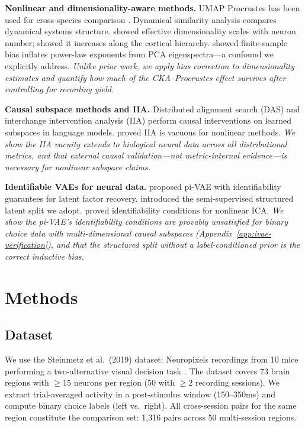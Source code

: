 \documentclass{article}
\begin{document}
\textbf{Nonlinear and dimensionality-aware methods.}
UMAP Procrustes has been used for cross-species comparison \citep{deitch2021representational}. Dynamical similarity analysis \citep{ostrow2023beyond} compares dynamical systems structure.
\citet{stringer2024unbounded} showed effective dimensionality scales with neuron number; \citet{huntenburg2024categorical} showed it increases along the cortical hierarchy.
\citet{chun2025dimensionality} showed finite-sample bias inflates power-law exponents from PCA eigenspectra---a confound we explicitly address.
\emph{Unlike prior work, we apply bias correction to dimensionality estimates and quantify how much of the CKA--Procrustes effect survives after controlling for recording yield.}

\textbf{Causal subspace methods and IIA.}
Distributed alignment search (DAS) and interchange intervention analysis (IIA) \citep{geiger2024causal, geiger2024finding} perform causal interventions on learned subspaces in language models.
\citet{sutter2025iia} proved IIA is vacuous for nonlinear methods.
\emph{We show the IIA vacuity extends to biological neural data across all distributional metrics, and that external causal validation---not metric-internal evidence---is necessary for nonlinear subspace claims.}

\textbf{Identifiable VAEs for neural data.}
\citet{zhou2020pivae} proposed pi-VAE with identifiability guarantees for latent factor recovery.
\citet{narayanaswamy2017learning} introduced the semi-supervised structured latent split we adopt.
\citet{khemakhem2020variational} proved identifiability conditions for nonlinear ICA.
\emph{We show the pi-VAE's identifiability conditions are provably unsatisfied for binary choice data with multi-dimensional causal subspaces (Appendix~\ref{app:ivae-verification}), and that the structured split without a label-conditioned prior is the correct inductive bias.}


\section{Methods}

\subsection{Dataset}

We use the Steinmetz et al.\ (2019) dataset: Neuropixels recordings from 10 mice performing a two-alternative visual decision task \citep{steinmetz2019distributed}. The dataset covers 73 brain regions with $\geq 15$ neurons per region (50 with $\geq 2$ recording sessions). We extract trial-averaged activity in a post-stimulus window (150--350ms) and compute binary choice labels (left vs.\ right). All cross-session pairs for the same region constitute the comparison set: 1,316 pairs across 50 multi-session regions.
\end{document}
